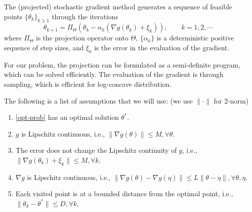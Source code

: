 \documentclass[psamsfonts]{article}
\theoremstyle{definition}
\theoremstyle{remark}
\numberwithin{equation} {section}
\begin{document}
The (projected) stochastic gradient method generates a sequence of feasible points $\{\theta_k\}_{k \ge 1}$ through the iterations
\begin{equation}\label{stoc-grad-iteration}
\theta_{k + 1} = \Pi_{\Theta} (\theta_k - \alpha_k (\nabla g(\theta_k) + \xi_k)), \qquad k = 1, 2, \cdots
\end{equation}
where $\Pi_{\Theta}$ is the projection operator onto $\Theta $, $\{\alpha_k\}$ is a deterministic positive sequence of step sizes, and $\xi_k$ is the error in the evaluation of the gradient.

For our problem, the projection can be formulated as a semi-definite program, which can be solved efficiently. The evaluation of the gradient is through sampling, which is efficient for log-concave distribution.

The following is a list of assumptions that we will use: (we use $\|\cdot \|$ for 2-norm)
\begin{enumerate}[(H1)]
\item \eqref{opt-prob} has an optimal solution $\theta^*$.
\item $g$ is Lipschitz continuous, i.e., $\| \nabla g(\theta) \| \le M, \forall \theta$.
\item The error does not change the Lipschitz continuity of $g$, i.e., $\| \nabla g(\theta_k) + \xi_k \| \le M, \forall k$.
\item $\nabla g$ is Lipschitz continuous, i.e., $\| \nabla g(\theta) - \nabla g(\eta) \| \le L \| \theta - \eta \|, \forall \theta, \eta$.
\item Each visited point is at a bounded distance from the optimal point, i.e., $ \| \theta_k - \theta^* \| \le D, \forall k$. 
\end{enumerate}
\end{document}
